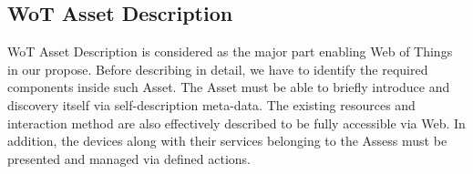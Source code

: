 \subsection{WoT Asset Description}
WoT Asset Description is considered as the major part enabling Web of Things in our propose. Before describing in detail, we have to identify the required components inside such Asset. The Asset must be able to briefly introduce and discovery itself via self-description meta-data. The existing resources and interaction method are also effectively described to be fully accessible via Web. In addition, the devices along with their services belonging to the Assess must be presented and managed via defined actions. 

